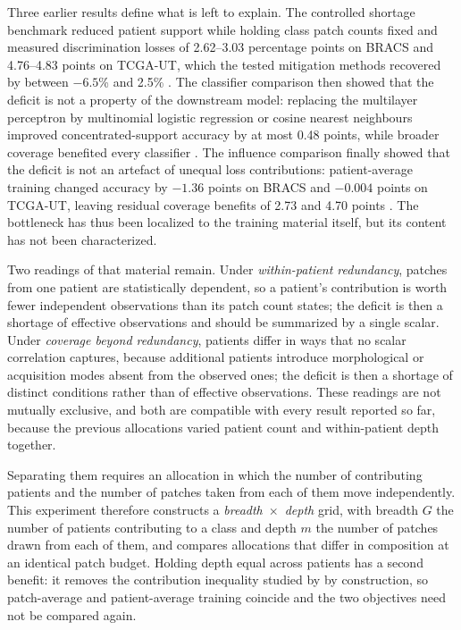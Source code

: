 \documentclass[11pt]{article}
\begin{document}
Three earlier results define what is left to explain. The controlled shortage benchmark reduced patient support while holding class patch counts fixed and measured discrimination losses of 2.62--3.03 percentage points on BRACS and 4.76--4.83 points on TCGA-UT, which the tested mitigation methods recovered by between $-6.5$\% and 2.5\% \citep{queisler2026benchmarkResults}. The classifier comparison then showed that the deficit is not a property of the downstream model: replacing the multilayer perceptron by multinomial logistic regression or cosine nearest neighbours improved concentrated-support accuracy by at most 0.48 points, while broader coverage benefited every classifier \citep{queisler2026patientShortage}. The influence comparison finally showed that the deficit is not an artefact of unequal loss contributions: patient-average training changed accuracy by $-1.36$ points on BRACS and $-0.004$ points on TCGA-UT, leaving residual coverage benefits of 2.73 and 4.70 points \citep{queisler2026patientInfluence}. The bottleneck has thus been localized to the training material itself, but its content has not been characterized.

Two readings of that material remain. Under \emph{within-patient redundancy}, patches from one patient are statistically dependent, so a patient's contribution is worth fewer independent observations than its patch count states; the deficit is then a shortage of effective observations and should be summarized by a single scalar. Under \emph{coverage beyond redundancy}, patients differ in ways that no scalar correlation captures, because additional patients introduce morphological or acquisition modes absent from the observed ones; the deficit is then a shortage of distinct conditions rather than of effective observations. These readings are not mutually exclusive, and both are compatible with every result reported so far, because the previous allocations varied patient count and within-patient depth together.

Separating them requires an allocation in which the number of contributing patients and the number of patches taken from each of them move independently. This experiment therefore constructs a \emph{breadth}~$\times$~\emph{depth} grid, with breadth $G$ the number of patients contributing to a class and depth $m$ the number of patches drawn from each of them, and compares allocations that differ in composition at an identical patch budget. Holding depth equal across patients has a second benefit: it removes the contribution inequality studied by \citet{queisler2026patientInfluence} by construction, so patch-average and patient-average training coincide and the two objectives need not be compared again.
\end{document}
